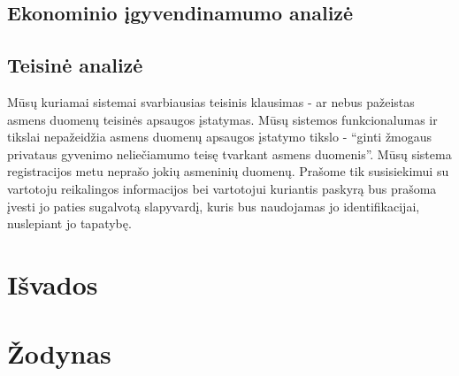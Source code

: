 \documentclass[oneside]{VUMIFPSkursinis}
\begin{document}
	\subsection{Ekonominio įgyvendinamumo analizė}
	\subsection{Teisinė analizė}
Mūsų kuriamai sistemai svarbiausias teisinis klausimas - ar nebus pažeistas asmens duomenų teisinės apsaugos įstatymas. Mūsų sistemos funkcionalumas ir tikslai nepažeidžia asmens duomenų apsaugos įstatymo tikslo - “ginti žmogaus privataus gyvenimo neliečiamumo teisę tvarkant asmens duomenis”. Mūsų sistema registracijos metu neprašo jokių asmeninių duomenų. Prašome tik susisiekimui su vartotoju reikalingos informacijos bei vartotojui kuriantis paskyrą bus prašoma įvesti jo paties sugalvotą slapyvardį, kuris bus naudojamas jo identifikacijai, nuslepiant jo tapatybę.
\section{Išvados}
\section{Žodynas}
\end{document}
